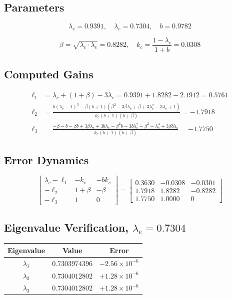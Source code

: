 \documentclass{article}
\begin{document}
\subsection*{Parameters}

\[
\lambda_c = 0.9391, \quad
\lambda_e = 0.7304, \quad
b = 0.9782
\]

\[
\beta = \sqrt{\lambda_c \cdot \lambda_e} = 0.8282, \quad
k_c = \frac{1 - \lambda_c}{1 + b} = 0.0308
\]

\subsection*{Computed Gains}

\begin{align*}
\ell_1 &= \lambda_c + (1 + \beta) - 3\lambda_e = 0.9391 + 1.8282 - 2.1912 = \boxed{0.5761} \\[1em]
\ell_2 &= \frac{b(\lambda_e - 1)^3 - \beta(b + 1)(\beta^2 - 3\beta\lambda_e + \beta + 3\lambda_e^2 - 3\lambda_e + 1)}{k_c(b + 1)(b + \beta)} = \boxed{-1.7918} \\[1em]
\ell_3 &= \frac{-\beta - b - \beta b + 3\beta\lambda_e + 3b\lambda_e - \beta^2 b - 3b\lambda_e^2 - \beta^2 - \lambda_e^3 + 3\beta b\lambda_e}{k_c(b+1)(b+\beta)} = \boxed{-1.7750}
\end{align*}

\subsection*{Error Dynamics}

\[
\begin{bmatrix}
\lambda_c - \ell_1 & -k_c & -bk_c \\[0.5em]
-\ell_2 & 1 + \beta & -\beta \\[0.5em]
-\ell_3 & 1 & 0
\end{bmatrix}
=
\begin{bmatrix}
0.3630 & -0.0308 & -0.0301 \\
1.7918 & 1.8282 & -0.8282 \\
1.7750 & 1.0000 & 0
\end{bmatrix}
\]

\subsection*{Eigenvalue Verification, $\lambda_e = 0.7304$}

\begin{center}
\begin{tabular}{ccc}
\hline
\textbf{Eigenvalue} & \textbf{Value} & \textbf{Error} \\
\hline
$\lambda_1$ & $0.7303974396$ & $-2.56 \times 10^{-6}$ \\
$\lambda_2$ & $0.7304012802$ & $+1.28 \times 10^{-6}$ \\
$\lambda_3$ & $0.7304012802$ & $+1.28 \times 10^{-6}$ \\
\hline
\end{tabular}
\end{center}
\end{document}
